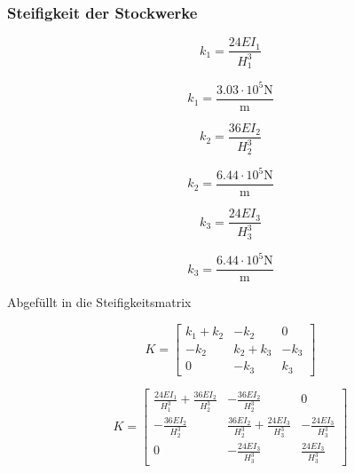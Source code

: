 \documentclass[
  letterpaper,
  DIV=11]{scrreprt}
\begin{document}
\hypertarget{steifigkeit-der-stockwerke}{%
\subsubsection{Steifigkeit der
Stockwerke}\label{steifigkeit-der-stockwerke}}

\begin{equation}k_{1} = \frac{24 EI_{1}}{H_{1}^{3}}\end{equation}

\begin{equation}k_{1} = \frac{3.03 \cdot 10^{5} \text{N}}{\text{m}}\end{equation}

\begin{equation}k_{2} = \frac{36 EI_{2}}{H_{2}^{3}}\end{equation}

\begin{equation}k_{2} = \frac{6.44 \cdot 10^{5} \text{N}}{\text{m}}\end{equation}

\begin{equation}k_{3} = \frac{24 EI_{3}}{H_{3}^{3}}\end{equation}

\begin{equation}k_{3} = \frac{6.44 \cdot 10^{5} \text{N}}{\text{m}}\end{equation}

Abgefüllt in die Steifigkeitsmatrix

\begin{equation}K = \left[\begin{matrix}k_{1} + k_{2} & - k_{2} & 0\\- k_{2} & k_{2} + k_{3} & - k_{3}\\0 & - k_{3} & k_{3}\end{matrix}\right]\end{equation}

\begin{equation}K = \left[\begin{matrix}\frac{24 EI_{1}}{H_{1}^{3}} + \frac{36 EI_{2}}{H_{2}^{3}} & - \frac{36 EI_{2}}{H_{2}^{3}} & 0\\- \frac{36 EI_{2}}{H_{2}^{3}} & \frac{36 EI_{2}}{H_{2}^{3}} + \frac{24 EI_{3}}{H_{3}^{3}} & - \frac{24 EI_{3}}{H_{3}^{3}}\\0 & - \frac{24 EI_{3}}{H_{3}^{3}} & \frac{24 EI_{3}}{H_{3}^{3}}\end{matrix}\right]\end{equation}
\end{document}
